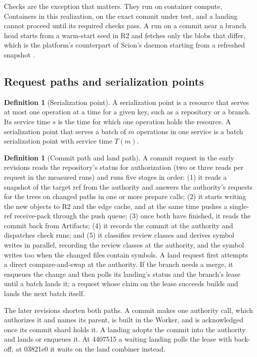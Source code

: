 \documentclass[11pt,letterpaper]{article}
\theoremstyle{definition}
\newtheorem{definition}[theorem]{Definition}
\theoremstyle{remark}
\begin{document}
Checks are the exception that matters. They run on container compute, Containers in this realization, on the exact commit under test, and a landing cannot proceed until its required checks pass. A run on a commit near a branch head starts from a warm-start seed in R2 and fetches only the blobs that differ, which is the platform's counterpart of Scion's daemon starting from a refreshed snapshot \cite{anthropic2026scion}.

\subsection{Request paths and serialization points}

\begin{definition}[Serialization point]
\label{def:sgoc:serialization-point}
A serialization point is a resource that serves at most one operation at a time for a given key, such as a repository or a branch. Its service time $s$ is the time for which one operation holds the resource. A serialization point that serves a batch of $m$ operations in one service is a batch serialization point with service time $T(m)$.
\end{definition}

\begin{definition}[Commit path and land path]
\label{def:sgoc:path}
A commit request in the early revisions reads the repository's status for authorization (two or three reads per request in the measured runs) and runs five stages in order:
(1) it reads a snapshot of the target ref from the authority and answers the authority's requests for the trees on changed paths in one or more prepare calls;
(2) it starts writing the new objects to R2 and the edge cache, and at the same time pushes a single-ref receive-pack through the push queue;
(3) once both have finished, it reads the commit back from Artifacts;
(4) it records the commit at the authority and dispatches check runs; and
(5) it classifies review classes and derives symbol writes in parallel, recording the review classes at the authority, and the symbol writes too when the changed files contain symbols.
A land request first attempts a direct compare-and-swap at the authority. If the branch needs a merge, it enqueues the change and then polls its landing's status and the branch's lease until a batch lands it; a request whose claim on the lease succeeds builds and lands the next batch itself.
\end{definition}

The later revisions shorten both paths. A commit makes one authority call, which authorizes it and names its parent, is built in the Worker, and is acknowledged once its commit shard holds it. A landing adopts the commit into the authority and lands or enqueues it. At 4407515 a waiting landing polls the lease with back-off; at 03821e0 it waits on the land combiner instead.
\end{document}
